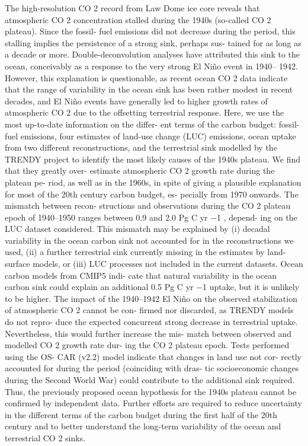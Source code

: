 \documentclass[
]{book}
\begin{document}
The high-resolution CO 2 record from Law Dome
ice core reveals that atmospheric CO 2 concentration stalled
during the 1940s (so-called CO 2 plateau). Since the fossil-
fuel emissions did not decrease during the period, this
stalling implies the persistence of a strong sink, perhaps sus-
tained for as long as a decade or more. Double-deconvolution
analyses have attributed this sink to the ocean, conceivably
as a response to the very strong El Niño event in 1940--
1942. However, this explanation is questionable, as recent
ocean CO 2 data indicate that the range of variability in the
ocean sink has been rather modest in recent decades, and
El Niño events have generally led to higher growth rates of
atmospheric CO 2 due to the offsetting terrestrial response.
Here, we use the most up-to-date information on the differ-
ent terms of the carbon budget: fossil-fuel emissions, four
estimates of land-use change (LUC) emissions, ocean uptake
from two different reconstructions, and the terrestrial sink
modelled by the TRENDY project to identify the most likely
causes of the 1940s plateau. We find that they greatly over-
estimate atmospheric CO 2 growth rate during the plateau pe-
riod, as well as in the 1960s, in spite of giving a plausible
explanation for most of the 20th century carbon budget, es-
pecially from 1970 onwards. The mismatch between recon-
structions and observations during the CO 2 plateau epoch of
1940--1950 ranges between 0.9 and 2.0 Pg C yr −1 , depend-
ing on the LUC dataset considered. This mismatch may be
explained by (i) decadal variability in the ocean carbon sink
not accounted for in the reconstructions we used, (ii) a further
terrestrial sink currently missing in the estimates by land-
surface models, or (iii) LUC processes not included in the
current datasets. Ocean carbon models from CMIP5 indi-
cate that natural variability in the ocean carbon sink could
explain an additional 0.5 Pg C yr −1 uptake, but it is unlikely
to be higher. The impact of the 1940--1942 El Niño on the
observed stabilization of atmospheric CO 2 cannot be con-
firmed nor discarded, as TRENDY models do not repro-
duce the expected concurrent strong decrease in terrestrial
uptake. Nevertheless, this would further increase the mis-
match between observed and modelled CO 2 growth rate dur-
ing the CO 2 plateau epoch. Tests performed using the OS-
CAR (v2.2) model indicate that changes in land use not cor-
rectly accounted for during the period (coinciding with dras-
tic socioeconomic changes during the Second World War)
could contribute to the additional sink required. Thus, the
previously proposed ocean hypothesis for the 1940s plateau
cannot be confirmed by independent data. Further efforts are
required to reduce uncertainty in the different terms of the
carbon budget during the first half of the 20th century and to
better understand the long-term variability of the ocean and
terrestrial CO 2 sinks.
\end{document}
